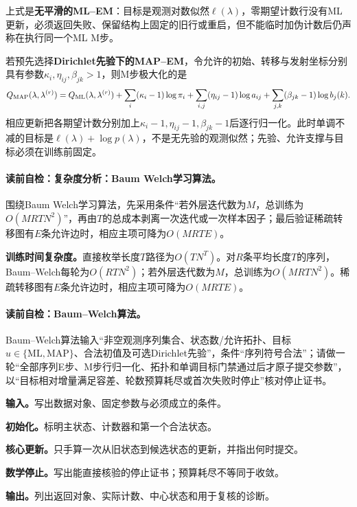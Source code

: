 上式是\textbf{无平滑的ML--EM}：目标是观测对数似然$\ell(\lambda)$，零期望计数行没有ML更新，必须返回失败、保留结构上固定的旧行或重启，但不能临时加伪计数后仍声称在执行同一个ML M步。

若预先选择\textbf{Dirichlet先验下的MAP--EM}，令允许的初始、转移与发射坐标分别具有参数$\kappa_i,\eta_{ij},\beta_{jk}>1$，则M步极大化的是
\[
Q_{\rm MAP}(\lambda,\lambda^{(r)})
=Q_{\rm ML}(\lambda,\lambda^{(r)})
+\sum_i(\kappa_i-1)\log\pi_i
+\sum_{i,j}(\eta_{ij}-1)\log a_{ij}
+\sum_{j,k}(\beta_{jk}-1)\log b_j(k).
\]
相应更新把各期望计数分别加上$\kappa_i-1,\eta_{ij}-1,\beta_{jk}-1$后逐行归一化。此时单调不减的目标是$\ell(\lambda)+\log p(\lambda)$，不是无先验的观测似然；先验、允许支撑与目标必须在训练前固定。
\endgroup

\label{struct:V3-C05-CH26}
\label{struct:V3-C05-CH27}
\paragraph{读前自检：复杂度分析：Baum Welch学习算法。}围绕Baum Welch学习算法，先采用条件“若外层迭代数为$M$，总训练为$O(MRTN^2)$”，再由$T$的总成本剥离一次迭代或一次样本因子；最后验证稀疏转移图有$E$条允许边时，相应主项可降为$O(MRTE)$。\par

\begin{complexitybox}
\textbf{训练时间复杂度。}直接枚举长度$T$路径为$O(TN^T)$。对$R$条平均长度$T$的序列，Baum--Welch每轮为$O(RTN^2)$；若外层迭代数为$M$，总训练为$O(MRTN^2)$。稀疏转移图有$E$条允许边时，相应主项可降为$O(MRTE)$。
\end{complexitybox}

\paragraph{读前自检：Baum--Welch算法。}Baum--Welch算法输入“非空观测序列集合、状态数/允许拓扑、目标$u\in\{\mathrm{ML},\mathrm{MAP}\}$、合法初值及可选Dirichlet先验”，条件“序列符号合法”；请做一轮“全部序列E步、M步行归一化、拓扑和单调目标门禁通过后才原子提交参数”，以“目标相对增量满足容差、轮数预算耗尽或首次失败时停止”核对停止证书。\par


\begin{keypointbox}[title={区分ML与MAP目标的Baum--Welch学习：五步阅读}]
\textbf{输入。}写出数据对象、固定参数与必须成立的条件。\par
\textbf{初始化。}标明主状态、计数器和第一个合法状态。\par
\textbf{核心更新。}只手算一次从旧状态到候选状态的更新，并指出何时提交。\par
\textbf{数学停止。}写出能直接核验的停止证书；预算耗尽不等同于收敛。\par
\textbf{输出。}列出返回对象、实际计数、中心状态和用于复核的诊断。
\end{keypointbox}

